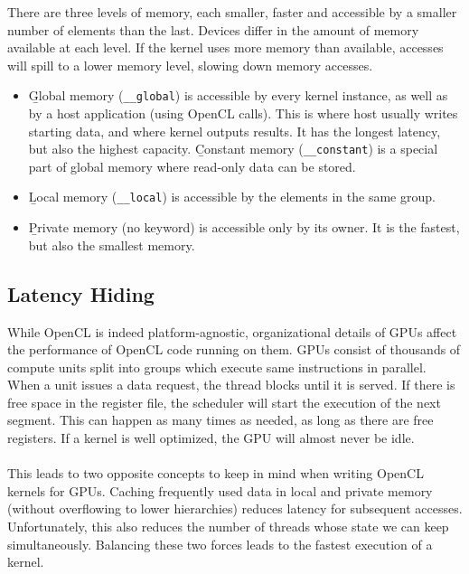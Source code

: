 \noindent There are three levels of memory, each smaller, faster and accessible by a smaller number of elements than the last. Devices differ in the amount of memory available at each level. If the kernel uses more memory than available, accesses will spill to a lower memory level, slowing down memory accesses.
\begin{itemize}
    \item \b{Global memory} (\texttt{\_\_global}) is accessible by every kernel instance, as well as by a host application (using OpenCL calls). This is where host usually writes starting data, and where kernel outputs results. It has the longest latency, but also the highest capacity. \b{Constant memory} (\texttt{\_\_constant}) is a special part of global memory where read-only data can be stored.
    \item \b{Local memory} (\texttt{\_\_local}) is accessible by the elements in the same group.
    \item \b{Private memory} (no keyword) is accessible only by its owner. It is the fastest, but also the smallest memory.
\end{itemize}

\subsection{Latency Hiding}

While OpenCL is indeed platform-agnostic, organizational details of GPUs affect the performance of OpenCL code running on them. GPUs consist of thousands of compute units split into groups which execute same instructions in parallel. When a unit issues a data request, the thread blocks until it is served. If there is free space in the register file, the scheduler will start the execution of the next segment. This can happen as many times as needed, as long as there are free registers. If a kernel is well optimized, the GPU will almost never be idle.\\
\\
This leads to two opposite concepts to keep in mind when writing OpenCL kernels for GPUs. Caching frequently used data in local and private memory (without overflowing to lower hierarchies) reduces latency for subsequent accesses. Unfortunately, this also reduces the number of threads whose state we can keep simultaneously. Balancing these two forces leads to the fastest execution of a kernel.\\
